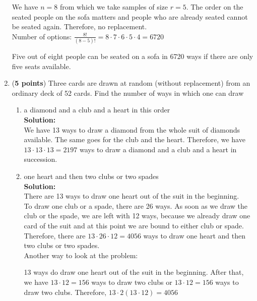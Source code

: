\documentclass[a4paper]{article}
\begin{document}
\begin{enumerate}
We have $n = 8$ from which we take samples of size $r = 5$. The order on the seated people on the sofa matters and people who are already seated cannot be seated again. Therefore, no replacement.\\

Number of options: $\frac{8!}{(8 - 5)!} = 8 \cdot 7 \cdot 6 \cdot 5 \cdot 4 = 6720$

Five out of eight people can be seated on a sofa in 6720 ways if there are only five seats available.\\




\item (\textbf{5 points}) Three cards are drawn at random (without replacement) from an ordinary deck of 52 cards. Find the number of ways in which one can draw



\begin{enumerate}
	\item a diamond and a club and a heart in this order\\
	\textbf{Solution:}\\
	
We have 13 ways to draw a diamond from the whole suit of diamonds available. The same goes for the club and the heart. Therefore, we have $13 \cdot 13 \cdot 13 = 2197$ ways to draw a diamond and a club and a heart in succession.\\	
	
	
	
	\item one heart and then two clubs or two spades\\
	\textbf{Solution:}\\
	
There are 13 ways to draw one heart out of the suit in the beginning.\\

To draw one club or a spade, there are 26 ways. As soon as we draw the club or the spade, we are left with 12 ways, because we already draw one card of the suit and at this point we are bound to either club or spade.\\
Therefore, there are $13 \cdot 26 \cdot 12 = 4056$ ways to draw one heart and then two clubs or two spades.\\

Another way to look at the problem:

13 ways do draw one heart out of the suit in the beginning. After that, we have $13 \cdot 12 = 156$ ways to draw two clubs or $13 \cdot 12 = 156$ ways to draw two clubs. Therefore, $13 \cdot 2(13 \cdot 12) = 4056$\\





\end{enumerate}
\end{enumerate}
\end{document}
